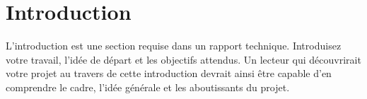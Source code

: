 \documentclass[
    iai, %
    il, %
]{heig-tb}
\begin{document}
\maketitle
\frontmatter
\clearemptydoublepage

\preamble
\authentification

\begin{abstract}
    
\end{abstract}

\clearemptydoublepage
{
    \tableofcontents
    \let\cleardoublepage\clearpage
    \listoffigures
    \let\cleardoublepage\clearpage
    \listoftables
    \let\cleardoublepage\clearpage
    \listoflistings
}

\printnomenclature
\clearemptydoublepage
{}

\mainmatter

\chapter{Introduction}
L'introduction est une section requise dans un rapport technique. Introduisez votre travail, l'idée de départ et les objectifs attendus. Un lecteur qui découvrirait votre projet au travers de cette introduction devrait ainsi être capable d'en comprendre le cadre, l'idée générale et les aboutissants du projet.
\end{document}
